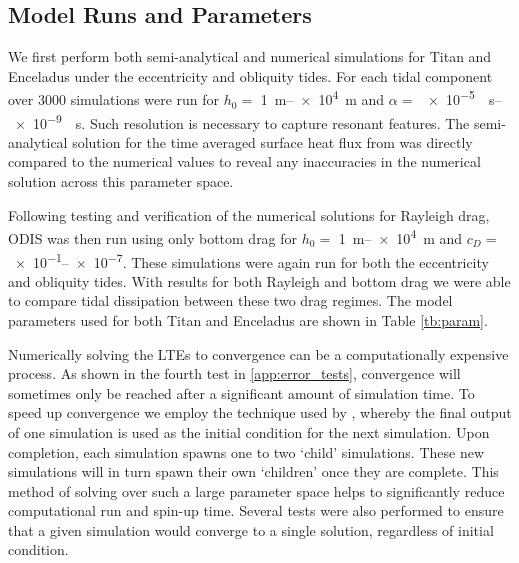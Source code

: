 \subsection{Model Runs and Parameters \label{subsec:param}}

We first perform both semi-analytical and numerical simulations for Titan and Enceladus under the eccentricity and obliquity tides. For each tidal component over 3000 simulations were run for $h_0 = $ \SIrange{1}{e4}{\metre} and $\alpha = $ \SIrange{e-5}{e-9}{\per\second}. Such resolution is necessary to capture resonant features. The semi-analytical solution for the time averaged surface heat flux from \citet{matsuyama2014tidal} was directly compared to the numerical values to reveal any inaccuracies in the numerical solution across this parameter space. 

Following testing and verification of the numerical solutions for Rayleigh drag, ODIS was then run using only bottom drag for $h_0 = $ \SIrange{1}{e4}{\metre} and $c_D = $ \numrange{e-1}{e-7}. These simulations were again run for both the eccentricity and obliquity tides. With results for both Rayleigh and bottom drag we were able to compare tidal dissipation between these two drag regimes. The model parameters used for both Titan and Enceladus are shown in Table \ref{tb:param}.

Numerically solving the LTEs to convergence can be a computationally expensive process. As shown in the fourth test in \ref{app:error_tests}, convergence will sometimes only be reached after a significant amount of simulation time. To speed up convergence we employ the technique used by \citet{sears1995tidal}, whereby the final output of one simulation is used as the initial condition for the next simulation. Upon completion, each simulation spawns one to two `child' simulations. These new simulations will in turn spawn their own `children' once they are complete. This method of solving over such a large parameter space helps to significantly reduce computational run and spin-up time. Several tests were also performed to ensure that a given simulation would converge to a single solution, regardless of initial condition.



